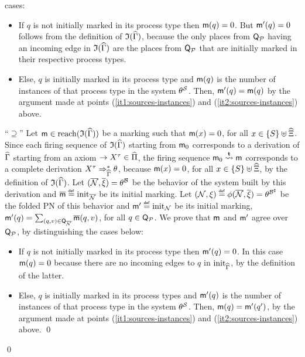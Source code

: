 \begin{proofE}
  cases: \begin{itemize}
  \item If $q$ is not initially marked in its process type then
    $\mathsf{m}(q)=0$. But $\mathsf{m}'(q)=0$ follows from the definition of
    $\mathfrak{I}({\widehat{\Gamma}})$, because the only places from
    $\mathsf{Q}_{\mathcal{P}}$ having an incoming edge in
    $\mathfrak{I}({\widehat{\Gamma}})$ are the places from
    $\mathsf{Q}_{\mathcal{P}}$ that are initially marked in their respective
    process types.
  \item Else, $q$ is initially marked in its process type and
    $\mathsf{m}(q)$ is the number of instances of that process type in the
    system $\theta^{\mathcal{S}}$. Then, $\mathsf{m}'(q)=\mathsf{m}(q)$ by the argument made at
    points (\ref{it1:sources-instances}) and
    (\ref{it2:sources-instances}) above.
  \end{itemize}

  \noindent ``$\supseteq$'' Let $\mathsf{m}\in
  \mathrm{reach}({\mathfrak{I}({\widehat{\Gamma}})})$ be a marking such that
  $\mathsf{m}(x)=0$, for all $x \in {\{ {S} \}} \uplus \widehat{\Xi}$.
  Since each firing sequence of $\mathfrak{I}({\widehat{\Gamma}})$ starting
  from $\mathsf{m}_0$ corresponds to a derivation of $\widehat{\Gamma}$
  starting from an axiom $\rightarrow {X}^{\tau} \in
  \widehat{\Pi}$, the firing sequence $\mathsf{m}_0 \stackrel{\mathbf{t}}{\leadsto}
  \mathsf{m}$ corresponds to a complete derivation ${X}^{\tau}
  \Rightarrow_{\widehat{\Gamma}}^* \theta$, because $\mathsf{m}(x)=0$, for all
  $x \in {\{ {S} \}}\uplus\widehat{\Xi}$, by the definition of
  $\mathfrak{I}({\widehat{\Gamma}})$. Let $(\overline{\mathcal{N}},
  \overline{\xi}) = \theta^{\mathcal{B}}$ be the behavior of the
  system built by this derivation and $\overline{\mathsf{m}} \stackrel{\scriptscriptstyle{\mathsf{def}}}{=}
  \mathrm{init}_{\overline{\mathcal{N}}}$ be its initial marking.  Let
  $(\mathcal{N},\xi) \stackrel{\scriptscriptstyle{\mathsf{def}}}{=} \phi({\overline{\mathcal{N}},
    \overline{\xi}}) = \theta^{{\mathcal{B}}^\sharp}$ be the folded
  PN of this behavior and $\mathsf{m}' \stackrel{\scriptscriptstyle{\mathsf{def}}}{=} \mathrm{init}_{\mathcal{N}}$ be
  its initial marking,
  \ie $\mathsf{m}'(q)=\sum_{(q,v)\in\mathsf{Q}_{\overline{\mathcal{N}}}} \overline{\mathsf{m}}(q,v)$,
  for all $q \in \mathsf{Q}_{\mathcal{P}}$.
  We prove that $\mathsf{m}$ and $\mathsf{m}'$ agree over $\mathsf{Q}_{\mathcal{P}}$,
  by distinguishing the cases below: \begin{itemize}
    \item If $q$ is not initially marked in its process type then
      $\mathsf{m}'(q)=0$. In this case $\mathsf{m}(q)=0$ because there are no
      incoming edges to $q$ in $\mathrm{init}_{\widehat{\Gamma}}$, by the
      definition of the latter. 
    \item Else, $q$ is initially marked in its process types and
      $\mathsf{m}'(q)$ is the number of instances of that process type in
      the system $\theta^{\mathcal{S}}$. Then, $\mathsf{m}(q)=\mathsf{m}'(q')$, by
      the argument made at points (\ref{it1:sources-instances}) and
      (\ref{it2:sources-instances}) above. \qed
  \end{itemize}
  \qed
\end{proofE}

